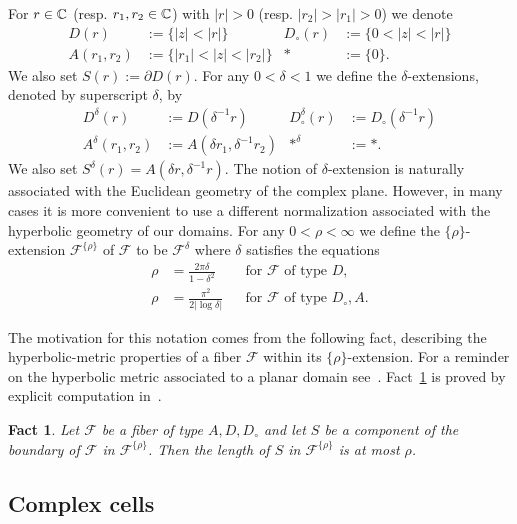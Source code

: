 \documentclass[reqno]{amsart}
\newtheorem{Fact}[Cor]{Fact}{\bfseries}{\itshape}
\renewcommand\~[1]{\widetilde{#1}}
\def\cF{{\mathcal F}} \def\cL{{\mathcal L}} \def\cR{{\mathcal R}}
\def\he#1{{\{#1\}}}
\def\hrho{{\he\rho}}
\begin{document}
For $r\in{\mathbb C}$ (resp. $r_1,r_2\in{\mathbb C}$) with $|r|>0$
(resp. $|r_2|>|r_1|>0$) we denote
\begin{align}
  D(r)&:=\{|z|<|r|\} & D_\circ(r)&:=\{0<|z|<|r|\} \\
  A(r_1,r_2)&:=\{|r_1|<|z|<|r_2|\} & *&:=\{0\}.
\end{align}
We also set $S(r):=\partial D(r)$. For any $0<\delta<1$ we define
the $\delta$-extensions, denoted by superscript $\delta$, by
\begin{align}
  D^\delta(r)&:=D(\delta^{-1}r) & D^\delta_\circ(r)&:=D_\circ(\delta^{-1}r) \\
  A^\delta(r_1,r_2)&:=A(\delta r_1,\delta^{-1}r_2) & *^\delta&:=*.
\end{align}
We also set $S^\delta(r)=A(\delta r,\delta^{-1}r)$. The notion of
$\delta$-extension is naturally associated with the Euclidean geometry
of the complex plane. However, in many cases it is more convenient to
use a different normalization associated with the hyperbolic geometry
of our domains. For any $0<\rho<\infty$ we define the
$\hrho$-extension $\cF^\hrho$ of $\cF$ to be $\cF^\delta$ where
$\delta$ satisfies the equations
\begin{equation}
  \begin{aligned}
    \rho &= \frac{2\pi\delta}{1-\delta^2} && \text{for $\cF$ of type
      $D$,} \\
    \rho &= \frac{\pi^2}{2|\log\delta|} && \text{for $\cF$ of type
      $D_\circ,A$}.
  \end{aligned}
\end{equation}

The motivation for this notation comes from the following fact,
describing the hyperbolic-metric properties of a fiber $\cF$ within
its $\hrho$-extension. For a reminder on the hyperbolic metric
associated to a planar domain see~.
Fact~\ref{fact:boundary-length} is proved by explicit computation
in~.

\begin{Fact}\label{fact:boundary-length}
  Let $\cF$ be a fiber of type $A,D,D_\circ$ and let $S$ be a component
  of the boundary of $\cF$ in $\cF^\hrho$. Then the length of $S$ in
  $\cF^\hrho$ is at most $\rho$.
\end{Fact}


\subsection{Complex cells}
\end{document}

